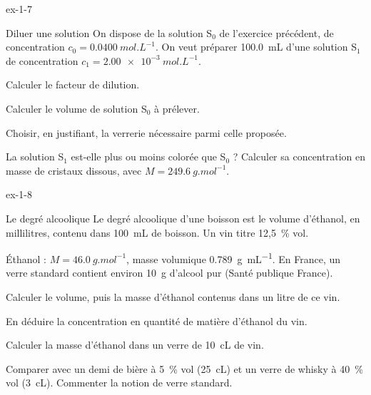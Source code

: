 \begin{blocLivre}{ex-1-7}
\begin{exercice}[2]{Diluer une solution}
On dispose de la solution S$_0$ de l'exercice précédent, de concentration $c_0=\qty{0,0400}{mol.L^{-1}}$. On veut préparer \qty{100,0}{mL} d'une
solution S$_1$ de concentration $c_1=\qty{2,00e-3}{mol.L^{-1}}$.
\begin{questions}
\item Calculer le facteur de dilution.
\item Calculer le volume de solution S$_0$ à prélever.
\item Choisir, en justifiant, la verrerie nécessaire parmi celle proposée.
\item La solution S$_1$ est-elle plus ou moins colorée que S$_0$ ? Calculer sa concentration en masse de cristaux dissous,
avec $M=\qty{249,6}{g.mol^{-1}}$.
\end{questions}
\end{exercice}
\end{blocLivre}
\begin{blocLivre}{ex-1-8}
\begin{exercice}[2]{Le degré alcoolique}
Le degré alcoolique d'une boisson est le volume d'éthanol, en millilitres, contenu dans \qty{100}{mL} de boisson. Un vin
titre 12,5~\% vol.
\begin{donnees}
Éthanol : $M=\qty{46,0}{g.mol^{-1}}$, masse volumique \qty{0,789}{g.mL^{-1}}. En France, un verre standard contient environ \qty{10}{g}
d'alcool pur (Santé publique France).
\end{donnees}
\begin{questions}
\item Calculer le volume, puis la masse d'éthanol contenus dans un litre de ce vin.
\item En déduire la concentration en quantité de matière d'éthanol du vin.
\item Calculer la masse d'éthanol dans un verre de \qty{10}{cL} de vin.
\item Comparer avec un demi de bière à 5~\% vol (\qty{25}{cL}) et un verre de whisky à 40~\% vol (\qty{3}{cL}). Commenter la notion de
verre standard.
\end{questions}
\end{exercice}
\end{blocLivre}
